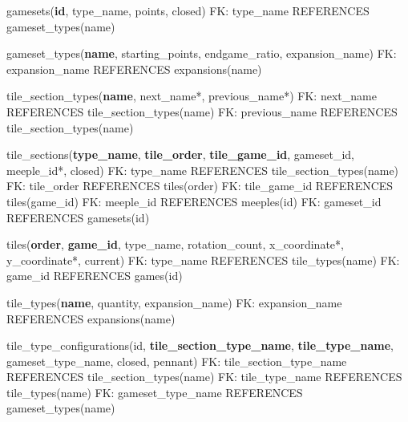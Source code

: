 gamesets(\textbf{id}, type\_name, points, closed)\newline
FK: type\_name REFERENCES gameset\_types(name)\newline

gameset\_types(\textbf{name}, starting\_points, endgame\_ratio, expansion\_name)\newline
FK: expansion\_name REFERENCES expansions(name)\newline

tile\_section\_types(\textbf{name}, next\_name*, previous\_name*)\newline
FK: next\_name REFERENCES tile\_section\_types(name)\newline
FK: previous\_name REFERENCES tile\_section\_types(name)\newline

tile\_sections(\textbf{type\_name}, \textbf{tile\_order}, \textbf{tile\_game\_id}, gameset\_id, meeple\_id*, closed)\newline
FK: type\_name REFERENCES tile\_section\_types(name)\newline
FK: tile\_order REFERENCES tiles(order)\newline
FK: tile\_game\_id REFERENCES tiles(game\_id)\newline
FK: meeple\_id REFERENCES meeples(id)\newline
FK: gameset\_id REFERENCES gamesets(id)\newline

tiles(\textbf{order}, \textbf{game\_id}, type\_name, rotation\_count, x\_coordinate*, y\_coordinate*, current)\newline
FK: type\_name REFERENCES tile\_types(name)\newline
FK: game\_id REFERENCES games(id)\newline

tile\_types(\textbf{name}, quantity, expansion\_name)\newline
FK: expansion\_name REFERENCES expansions(name)\newline

tile\_type\_configurations(id, \textbf{tile\_section\_type\_name}, \textbf{tile\_type\_name}, gameset\_type\_name, closed, pennant)\newline
FK: tile\_section\_type\_name REFERENCES tile\_section\_types(name)\newline
FK: tile\_type\_name REFERENCES tile\_types(name)\newline
FK: gameset\_type\_name REFERENCES gameset\_types(name)\newline

